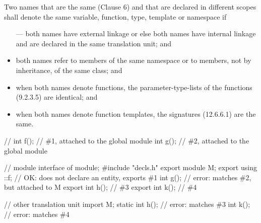 \begin{std.txt}
  \pnum[10]
  \addtocounter{footnote}{1}
  Two
  names that are the same (Clause 6) and that are declared in different scopes
  shall denote the same variable, function, type, template or namespace if
  \begin{itemize}
    \item[---] both names have external  linkage
      or else both names have internal linkage and are declared in
      the same translation unit; and

      \item both names refer to members of the same namespace or to members,
      not by inheritance, of the same class; and

      \item when both names denote functions, the parameter-type-lists of the
      functions (9.2.3.5) are identical; and

      \item when both names denote function templates, the signatures (12.6.6.1)
      are the same.
  \end{itemize}

  \pnum
  \color{addclr}
  \begin{example}
    \begin{codeblock}
      // 
      int f();            // \#1, attached to the global module
      int g();            // \#2, attached to the global module

      // module interface of 
      module;
      #include "decls.h"
      export module M;
      export using ::f;   // OK: does not declare an entity, exports \#1
      int g();            // error: matches \#2, but attached to M
      export int h();     // \#3
      export int k();     // \#4

      // other translation unit
      import M;
      static int h();     // error: matches \#3
      int k();            // error: matches \#4
    \end{codeblock}
  \end{example}
\end{std.txt}


